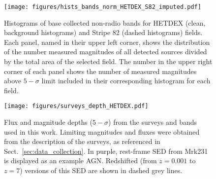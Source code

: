 \documentclass{aa}
\begin{document}
\begin{figure}
   \centering
   \texttt{[image: figures/hists\_bands\_norm\_HETDEX\_S82\_imputed.pdf]}
   \caption{Histograms of base collected non-radio bands for HETDEX (clean, background histograms) and Stripe 82 (dashed histograms) fields. Each panel, named in their upper left corner, shows the distribution of the number measured magnitudes of all detected sources divided by the total area of the selected field. The number in the upper right corner of each panel shows the number of measured magnitudes above $5{-}\sigma$ limit included in their corresponding histogram for each field.}
   \label{fig:hists_bands_HETDEX_S82}
\end{figure}

\begin{table}
\setlength{\tabcolsep}{2pt}
\caption{Bands available for model training in our dataset}             %
\label{table:used_bands}      %
\centering                          %
\end{table}

\begin{figure}
   \centering
   \texttt{[image: figures/surveys\_depth\_HETDEX.pdf]}
   \caption{Flux and magnitude depths ($5{-}\sigma$) from the surveys and bands used in this work. Limiting magnitudes and fluxes were obtained from the description of the surveys, as referenced in Sect.~\ref{sec:data_collection}. In purple, rest-frame SED from Mrk231 \citep[$z = 0.0422$,][]{2019MNRAS.489.3351B} is displayed as an example AGN. Redshifted (from $z {=} 0.001$ to $z {=} 7$) versions of this SED are shown in dashed grey lines.}
   \label{fig:surveys_depth_HETDEX}
\end{figure}
\end{document}
